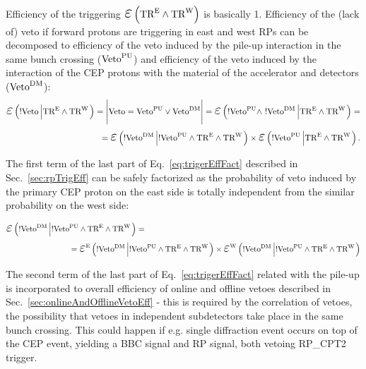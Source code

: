 Efficiency of the triggering $\mbox{\LARGE$\varepsilon$}\left(\TRE\land\TRW\right)$ is basically 1. Efficiency of the (lack of) veto if forward protons are triggering in east and west RPs can be decomposed to efficiency of the veto induced by the pile-up interaction in the same bunch crossing ($\text{Veto}^{\text{PU}}$) and efficiency of the veto induced by the interaction of the CEP protons with the material of the accelerator and detectors ($\text{Veto}^{\text{DM}}$):
\begin{equation}\label{eq:trigerEffFact}
\begin{split}
\mbox{\LARGE$\varepsilon$}\left(!\V\left|\TRE\land\TRW\right.\right)=\Bigg|\V=\Vpu\vee\Vdm\Bigg|=\mbox{\LARGE$\varepsilon$}\left(!\Vpu\land~!\Vdm\left|\TRE\land\TRW\right.\right) = \\ 
= \mbox{\LARGE$\varepsilon$}\left(!\Vdm\left|!\Vpu\land\TRE\land\TRW\right.\right) \times \mbox{\LARGE$\varepsilon$}\left(!\Vpu\left|\TRE\land\TRW\right.\right).
\end{split}
\end{equation}

The first term of the last part of Eq.~\eqref{eq:trigerEffFact} described in Sec.~\ref{sec:rpTrigEff} can be safely factorized as the probability of veto induced by the primary CEP proton on the east side is totally independent from the similar probability on the west side:

\begin{equation}
\begin{split}
\mbox{\LARGE$\varepsilon$}\left(!\Vdm\left|!\Vpu\land\TRE\land\TRW\right.\right) = ~~~~~~~~~~~~~~~~~~~~~~~~~~~~~~~~~~~~~~~~~~~~~~~~~~~~~~~~~~~~~~~~~~~~~~~~~~~~~~~~~~\\ 
=\mbox{\LARGE$\varepsilon$}^{\text{E}}\left(!\Vdm\left|!\Vpu\land\TRE\land\TRW\right.\right) \times \mbox{\LARGE$\varepsilon$}^{\text{W}}\left(!\Vdm\left|!\Vpu\land\TRE\land\TRW\right.\right)
\end{split}
\end{equation}

The second term of the last part of Eq.~\eqref{eq:trigerEffFact} related with the pile-up is incorporated to overall efficiency of online and offline vetoes described in Sec.~\ref{sec:onlineAndOfflineVetoEff} - this is required by the correlation of vetoes, the possibility that vetoes in independent subdetectors take place in the same bunch crossing. This could happen if e.g. single diffraction event occurs on top of the CEP event, yielding a BBC signal and RP signal, both vetoing RP\_CPT2 trigger.




